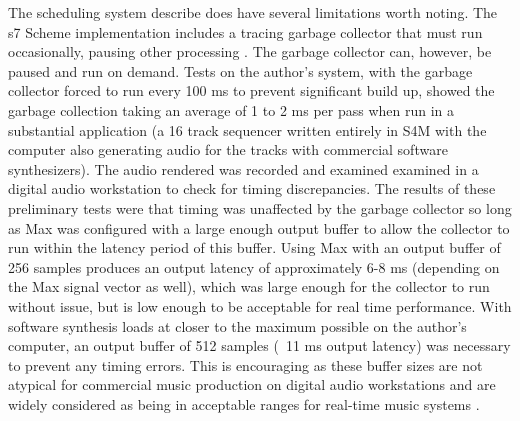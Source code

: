 \documentclass[acmsmall]{acmart}
\begin{document}
The scheduling system describe does have several limitations worth noting.
The s7 Scheme implementation includes a tracing garbage collector 
that must run occasionally, pausing other processing \cite{Matheussen2020}.
The garbage collector can, however, be paused and run on demand. Tests on the author's
system, with the garbage collector forced to run every 100 ms to prevent
significant build up, showed the garbage collection taking an average of 1 to 2 ms per pass
when run in a substantial application (a 16 track sequencer written entirely in S4M
with the computer also generating audio for the tracks with commercial
software synthesizers).  
The audio rendered was recorded and examined
examined in a digital audio workstation to check for timing discrepancies. The
results of these preliminary tests were that timing was unaffected by the 
garbage collector so long as Max was configured with 
a large enough output buffer to allow the collector to run within the 
latency period of this buffer.
Using Max with an output buffer of 256 samples produces an output latency
of approximately 6-8 ms (depending on the Max signal vector as well), which
was large enough for the collector to run without issue, but is 
low enough to be acceptable for real time performance. With software synthesis
loads at closer to the maximum possible on the author's computer,
an output buffer of 512 samples (~11 ms output latency) was necessary to prevent
any timing errors. This is encouraging as these buffer sizes are not atypical
for commercial music production on digital audio workstations and are widely
considered as being in acceptable ranges for real-time music systems \cite{Brandt1998}.
\end{document}
